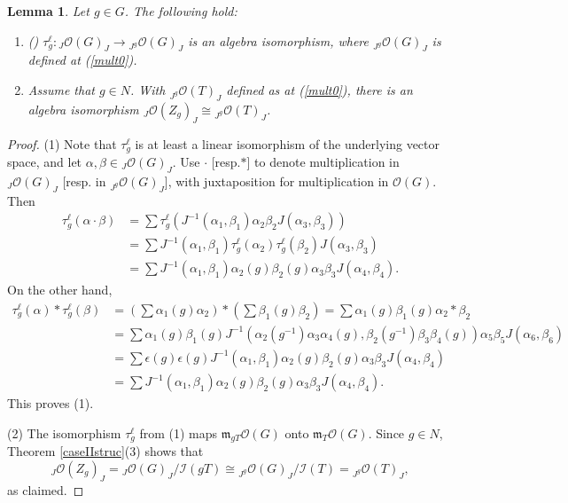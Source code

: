 \documentclass{amsart}
\numberwithin{equation}{section}
\newtheorem{lemma}[theorem]{Lemma}
\theoremstyle{definition}
\begin{document}
\begin{lemma}\label{stratIIfinish}
Let $g\in G$. The following hold:
\begin{enumerate}
\item 
{\rm (\cite[Lemma 3.16]{G2})} $\tau^{\ell}_g :{}_J\mathcal{O}(G)_J\rightarrow {}_{J^g}\mathcal{O}(G)_J$ 
is an algebra isomorphism, where ${}_{J^g} \mathcal{O}(G)_J $ is defined at (\ref{mult0}).

\item 
Assume that $g \in N$. With ${}_{J^g} \mathcal{O}(T)_J $ defined as at (\ref{mult0}), there is an algebra isomorphism 
${}_J\mathcal{O}(Z_g)_J\cong {}_{J^g} \mathcal{O}(T)_J$.
\end{enumerate}
\end{lemma}

\begin{proof}
(1) Note that $\tau^{\ell}_g$ is at least a linear isomorphism of the underlying vector space, and let $\alpha, \beta \in {}_J\mathcal{O}(G)_J$. Use $\cdot$ [resp.$\ast$] to denote multiplication in ${}_J\mathcal{O}(G)_J$ [resp. in ${}_{J^g}\mathcal{O}(G)_J$], with juxtaposition for multiplication in $\mathcal{O}(G)$. Then
\begin{align*} \tau^{\ell}_g (\alpha \cdot\beta) &= \sum \tau^{\ell}_g\left(J^{-1} (\alpha_1 ,\beta_1) \alpha_2\beta_2 J(\alpha_3, \beta_3)\right)\\
&= \sum J^{-1} (\alpha_1 ,\beta_1)\tau^{\ell}_g(\alpha_2)\tau^{\ell}_g(\beta_2) J(\alpha_3, \beta_3)\\
&= \sum J^{-1} (\alpha_1 ,\beta_1)\alpha_2(g)\beta_2(g) \alpha_3\beta_3 J(\alpha_4, \beta_4).
\end{align*}
On the other hand, 
\begin{align*} 
\tau^{\ell}_g(\alpha )\ast \tau^{\ell}_g(\beta) &=   \left(\sum \alpha_1(g)\alpha_2\right) \ast \left(\sum \beta_1(g)\beta_2\right)= \sum \alpha_1(g)\beta_1(g)\alpha_2 \ast \beta_2\\
&= \sum \alpha_1(g)\beta_1(g) J^{-1}\left(\alpha_2(g^{-1})\alpha_3 \alpha_4(g),\beta_2(g^{-1})\beta_3\beta_4(g)\right)\alpha_5\beta_5J(\alpha_6,\beta_6)\\
&= \sum\epsilon(g)\epsilon(g)J^{-1}(\alpha_1,\beta_1)\alpha_2(g)\beta_2(g)\alpha_3\beta_3J(\alpha_4,\beta_4)\\
&= \sum J^{-1}(\alpha_1, \beta_1) \alpha_2(g)\beta_2(g)\alpha_3\beta_3J(\alpha_4,\beta_4).
\end{align*}
This proves (1).

(2) The isomorphism $\tau^{\ell}_g$ from (1) maps $\mathfrak{m}_{gT}\mathcal{O}(G)$ onto $\mathfrak{m}_{T}\mathcal{O}(G)$. Since $g \in N$, Theorem \ref{caseIIstruc}(3) shows that 
$${}_J\mathcal{O}(Z_g)_J = {}_J\mathcal{O}(G)_J/\mathcal{I}(gT)\cong  {}_{J^g}\mathcal{O}(G)_J/\mathcal{I}(T) = {}_{J^g}\mathcal{O}(T)_J,$$
as claimed.
\end{proof}
\end{document}
